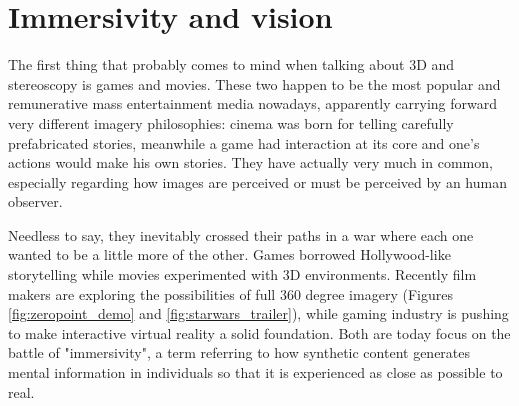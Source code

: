 \section{Immersivity and vision}
The first thing that probably comes to mind when talking about 3D and stereoscopy is games and movies. These two happen to be the most popular and remunerative mass entertainment media nowadays, apparently carrying forward very different imagery philosophies: cinema was born for telling carefully prefabricated stories, meanwhile a game had interaction at its core and one’s actions would make his own stories. They have actually very much in common, especially regarding how images are perceived or must be perceived by an human observer. 

Needless to say, they inevitably crossed their paths in a war where each one wanted to be a little more of the other. Games borrowed Hollywood-like storytelling while movies experimented with 3D environments. Recently film makers are exploring the possibilities of full 360 degree imagery (Figures \ref{fig:zeropoint_demo} and \ref{fig:starwars_trailer}), while gaming industry is pushing to make interactive virtual reality a solid foundation. Both are today focus on the battle of "immersivity", a term referring to how synthetic content generates mental information in individuals so that it is experienced as close as possible to real.

